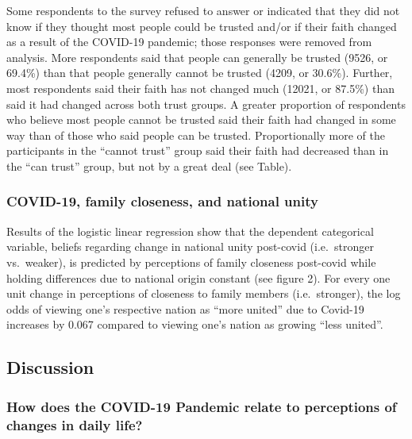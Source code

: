 \documentclass[
  english,
  man]{apa6}
\begin{document}
Some respondents to the survey refused to answer or indicated that they did not know if they thought most people could be trusted and/or if their faith changed as a result of the COVID-19 pandemic; those responses were removed from analysis.
More respondents said that people can generally be trusted (9526, or 69.4\%) than that people generally cannot be trusted (4209, or 30.6\%). Further, most respondents said their faith has not changed much (12021, or 87.5\%) than said it had changed across both trust groups.
A greater proportion of respondents who believe most people cannot be trusted said their faith had changed in some way than of those who said people can be trusted. Proportionally more of the participants in the \enquote{cannot trust} group said their faith had decreased than in the \enquote{can trust} group, but not by a great deal (see Table).

\hypertarget{covid-19-family-closeness-and-national-unity}{%
\subsubsection{COVID-19, family closeness, and national unity}\label{covid-19-family-closeness-and-national-unity}}

Results of the logistic linear regression show that the dependent categorical variable, beliefs regarding change in national unity post-covid (i.e.~stronger vs.~weaker), is predicted by perceptions of family closeness post-covid while holding differences due to national origin constant (see figure 2). For every one unit change in perceptions of closeness to family members (i.e.~stronger), the log odds of viewing one's respective nation as \enquote{more united} due to Covid-19 increases by 0.067 compared to viewing one's nation as growing \enquote{less united}.

\hypertarget{discussion}{%
\subsection{Discussion}\label{discussion}}

\hypertarget{how-does-the-covid-19-pandemic-relate-to-perceptions-of-changes-in-daily-life}{%
\subsubsection{How does the COVID-19 Pandemic relate to perceptions of changes in daily life?}\label{how-does-the-covid-19-pandemic-relate-to-perceptions-of-changes-in-daily-life}}
\end{document}
